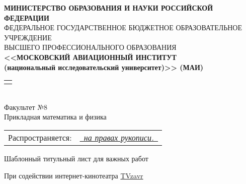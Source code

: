 
\begin{titlepage}

\newcommand{\byhand}[1]{\underline{\it \color{blue} \ #1\ }}

{\small\begin{center}
		{\bfseries
			МИНИСТЕРСТВО ОБРАЗОВАНИЯ И НАУКИ РОССИЙСКОЙ ФЕДЕРАЦИИ
		} \\
		{ \footnotesize
			ФЕДЕРАЛЬНОЕ ГОСУДАРСТВЕННОЕ БЮДЖЕТНОЕ ОБРАЗОВАТЕЛЬНОЕ УЧРЕЖДЕНИЕ \\
					ВЫСШЕГО ПРОФЕССИОНАЛЬНОГО ОБРАЗОВАНИЯ \\
		}
		{\bfseries
			<<МОСКОВСКИЙ АВИАЦИОННЫЙ ИНСТИТУТ \\	
			(национальный исследовательский университет)>> (МАИ)\\
		}
		\begin{tabular}{p{13cm}}
			\hline \\
		\end{tabular}\\
		{Факультет №8\\
			{ \footnotesize  Прикладная математика и физика }
		}
\end{center}}

\vspace{24pt}

{ \small \begin{flushright}
		\begin{tabular}{rl}
			Распространяется: & \byhand{на правах рукописи.} \\
		\end{tabular}
\end{flushright}}

\vspace{24pt}
	
\begin{center}
	\sffamily
	{ \Large
		\begin{onehalfspacing}
			Шаблонный титульный лист для важных работ
		\end{onehalfspacing}
	}

    \vspace{24pt}

    { \large
        \begin{onehalfspacing}
            При содействии интернет-кинотеатра \href{http://tvzavr.ru}{TVzavr} \\
            \vspace{30pt}
        \end{onehalfspacing}
    }



\end{center}
\end{titlepage}
